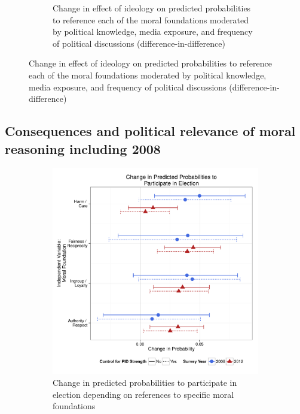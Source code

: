 \documentclass[12pt]{article}
\begin{document}
\begin{figure}[ht]
\begin{subfigure}[t]{0.49\textwidth}
    \caption{Change in effect of ideology on predicted probabilities to reference each of the moral foundations moderated by political knowledge, media exposure, and frequency of political discussions (difference-in-difference)}\label{fig:appD8ideolearn}
  \end{subfigure}
\end{figure}


\clearpage
\subsection{Consequences and political relevance of moral reasoning including 2008}

\begin{figure}[ht]
  \centering
  \caption{INSERT DESCRIPTION}
  \begin{subfigure}[t]{0.49\textwidth}
    \includegraphics[scale=.35]{../calc/fig/appD9turnout.pdf}
    \caption{Change in predicted probabilities to participate in election depending on references to specific moral foundations}\label{fig:appD9turnout}
  \end{subfigure}
  \begin{subfigure}[t]{0.49\textwidth}

\end{subfigure}
\end{figure}
\end{document}
